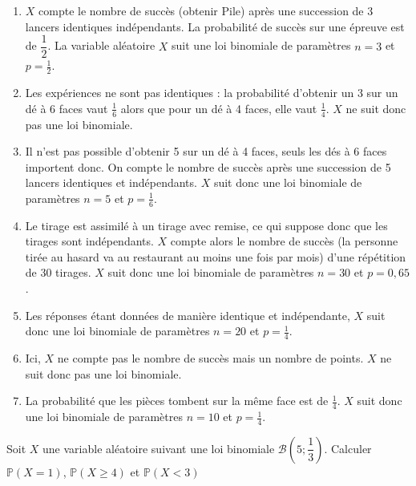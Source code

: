 \documentclass[11pt,fleqn, openany]{book} %
\begin{document}
\begin{solution}\hspace{0pt}
\begin{enumerate}
\item $X$ compte le nombre de succès (obtenir Pile) après une succession de 3 lancers identiques indépendants. La probabilité de succès sur une épreuve est de $\dfrac{1}{2}$. La variable aléatoire $X$ suit une loi binomiale de paramètres $n=3$ et $p=\frac{1}{2}$.
\item Les expériences ne sont pas identiques : la probabilité d'obtenir un 3 sur un dé à 6 faces vaut $\frac{1}{6}$ alors que pour un dé à 4 faces, elle vaut $\frac{1}{4}$. $X$ ne suit donc pas une loi binomiale.
\item Il n'est pas possible d'obtenir 5 sur un dé à 4 faces, seuls les dés à 6 faces importent donc. On compte le nombre de succès après une succession de 5 lancers identiques et indépendants. $X$ suit donc une loi binomiale de paramètres $n=5$ et $p=\frac{1}{6}$.
\item Le tirage est assimilé à un tirage avec remise, ce qui suppose donc que les tirages sont indépendants. $X$ compte alors le nombre de succès (la personne tirée au hasard va au restaurant au moins une fois par mois) d'une répétition de 30 tirages. $X$ suit donc une loi binomiale de paramètres $n=30$ et $p=0,65$.
\item Les réponses étant données de manière identique et indépendante, $X$ suit donc une loi binomiale de paramètres $n=20$ et $p=\frac{1}{4}$.
\item Ici, $X$ ne compte pas le nombre de succès mais un nombre de points. $X$ ne suit donc pas une loi binomiale.
\item La probabilité que les pièces tombent sur la même face est de $\frac{1}{4}$. $X$ suit donc une loi binomiale de paramètres $n=10$ et $p=\frac{1}{4}$.
\end{enumerate}

\end{solution}


\begin{exercise}Soit $X$ une variable aléatoire suivant une loi binomiale $\mathcal{B}\left(5;\dfrac{1}{3}\right)$. Calculer $\mathbb{P}(X=1)$,  $\mathbb{P}(X \geqslant 4)$ et $\mathbb{P}(X<3)$\end{exercise}
\end{document}

